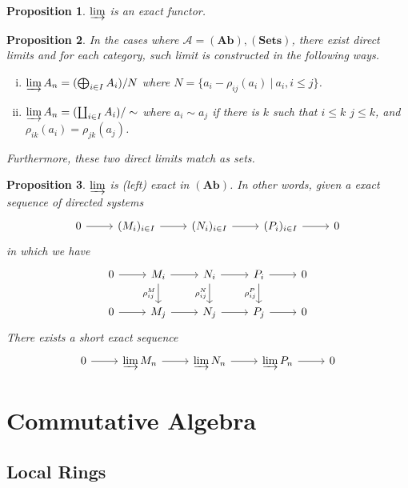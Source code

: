 \documentclass{article}
\newtheorem{proposition}{Proposition}[section]
\numberwithin{equation}{section}
\begin{document}
\begin{proposition}
\label{direct_limit_exact_functor}
$\varinjlim$ is an exact functor.
\end{proposition}

\begin{proposition}
In the cases where $\mathcal{A}=(\mathbf{Ab}),(\mathbf{Sets})$, there exist direct limits and for each category, such limit is constructed in the following ways.
\begin{enumerate}[i).]
\item $\varinjlim A_n = (\bigoplus_{i\in I}A_i)/N$ where $N=\{a_i-\rho_{ij}(a_i)\:|\:a_i,i\leq j\}$.
\item $\varinjlim A_n = (\coprod_{i\in I}A_i)/\sim$ where $a_i\sim a_j$ if there is $k$ such that $i\leq k$ $j\leq k$, and $\rho_{ik}(a_i)=\rho_{jk}(a_j)$.
\end{enumerate}
Furthermore, these two direct limits match as sets.
\end{proposition}

\begin{proposition}
$\varinjlim$ is (left) exact in $(\mathbf{Ab})$. In other words, 
given a exact sequence of directed systems 
\[
\begin{tikzcd}
0 \arrow[r] & (M_i)_{i\in I} \arrow[r] & (N_i)_{i\in I} \arrow[r] & (P_i)_{i\in I} \arrow[r] & 0
\end{tikzcd}
\]
in which we have
\[
\begin{tikzcd}
0 \arrow[r] & M_i \arrow[r] \arrow[d, "\rho^M_{ij}"'] & N_i \arrow[r] \arrow[d, "\rho^N_{ij}"'] & P_i \arrow[r] \arrow[d, "\rho^P_{ij}"'] & 0 \\
0 \arrow[r] & M_j \arrow[r]                           & N_j \arrow[r]                           & P_j \arrow[r]                           & 0
\end{tikzcd}
\]
There exists a short exact sequence 
\[
\begin{tikzcd}
0 \arrow[r] & \varinjlim M_n \arrow[r] & \varinjlim N_n \arrow[r] & \varinjlim P_n \arrow[r] & 0
\end{tikzcd}
\]
\end{proposition}

\section{Commutative Algebra}

\subsection{Local Rings}
\end{document}
